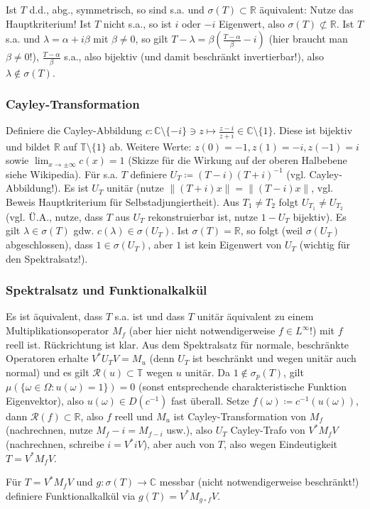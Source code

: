 \documentclass[11pt,a4paper]{scrartcl}
\newcommand{\R}{\mathbb{R}} %
\newcommand{\C}{\mathbb{C}} %
\newcommand{\Rc}{\mathcal{R}}
\theoremstyle{plain}
\theoremstyle{definition}
\theoremstyle{remark}
\begin{document}
Ist $T$ d.d., abg., symmetrisch, so sind s.a. und $\sigma(T)\subset \R$ äquivalent: Nutze das Hauptkriterium! Ist $T$ nicht s.a., so ist $i$ oder $-i$ Eigenwert, also $\sigma(T) \not\subset \R$. Ist $T$ s.a. und $\lambda=\alpha + i\beta$ mit $\beta\neq 0$, so gilt $T-\lambda = \beta(\frac{T-\alpha}{\beta}-i)$ (hier braucht man $\beta\neq 0$!), $\frac{T-\alpha}{\beta}$ s.a., also bijektiv (und damit beschränkt invertierbar!), also $\lambda \not\in \sigma(T)$.

\subsubsection{Cayley-Transformation}

Definiere die Cayley-Abbildung $c: \C\setminus \{-i\} \ni z \mapsto \frac{z-i}{z+i} \in \C\setminus \{1\}$. Diese ist bijektiv und bildet $\R$ auf $\mathbb{T} \setminus \{1\}$ ab. Weitere Werte: $z(0)=-1, z(1)=-i, z(-1)=i$ sowie $\lim_{x\to \pm \infty} c(x) = 1$ (Skizze für die Wirkung auf der oberen Halbebene siehe Wikipedia). Für s.a. $T$ definiere $U_T\coloneqq (T-i)(T+i)^{-1}$ (vgl. Cayley-Abbildung!). Es ist $U_T$ unitär (nutze $\|(T+i)x\|=\|(T-i)x\|$, vgl. Beweis Hauptkriterium für Selbstadjungiertheit). Aus $T_1\neq T_2$ folgt $U_{T_1}\neq U_{T_2}$ (vgl. Ü.A., nutze, dass $T$ aus $U_T$ rekonstruierbar ist, nutze $1-U_T$ bijektiv). Es gilt $\lambda\in \sigma(T)$ gdw. $c(\lambda)\in \sigma(U_T)$. Ist $\sigma(T)=\R$, so folgt (weil $\sigma(U_T)$ abgeschlossen), dass $1\in \sigma(U_T)$, aber $1$ ist kein Eigenwert von $U_T$ (wichtig für den Spektralsatz!).

\subsubsection{Spektralsatz und Funktionalkalkül}

Es ist äquivalent, dass $T$ s.a. ist und dass $T$ unitär äquivalent zu einem Multiplikationsoperator $M_f$ (aber hier nicht notwendigerweise $f\in L^\infty$!) mit $f$ reell ist. Rückrichtung ist klar. Aus dem Spektralsatz für normale, beschränkte Operatoren erhalte $V^*U_TV=M_u$ (denn $U_T$ ist beschränkt und wegen unitär auch normal) und es gilt $\Rc(u)\subset \mathbb T$ wegen $u$ unitär. Da $1\not\in \sigma_p(T)$, gilt $\mu(\{\omega\in \Omega: u(\omega)=1\})=0$ (sonst entsprechende charakteristische Funktion Eigenvektor), also $u(\omega)\in D(c^{-1})$ fast überall. Setze $f(\omega)\coloneqq c^{-1}(u(\omega))$, dann $\Rc(f) \subset \R$, also $f$ reell und $M_u$ ist Cayley-Transformation von $M_f$ (nachrechnen, nutze $M_f-i=M_{f-i}$ usw.), also $U_T$ Cayley-Trafo von $V^*M_fV$ (nachrechnen, schreibe $i=V^*iV$), aber auch von $T$, also wegen Eindeutigkeit $T=V^*M_fV$.

Für $T=V^*M_fV$ und $g:\sigma(T)\to \C$ messbar (nicht notwendigerweise beschränkt!) definiere Funktionalkalkül via $g(T)=V^*M_{g\circ f}V$.
\end{document}

